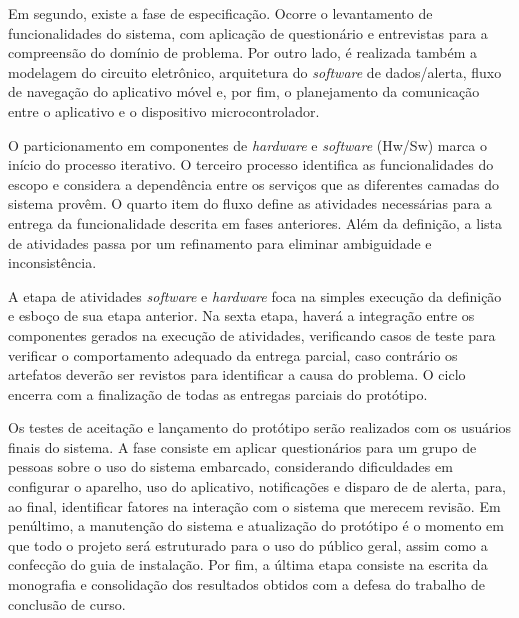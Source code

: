 Em segundo, existe a fase de especificação. Ocorre o levantamento de funcionalidades do sistema, com aplicação de questionário 
e entrevistas para a compreensão do domínio de problema. Por outro lado, é realizada também a modelagem do circuito 
eletrônico, arquitetura do \textit{software} de dados/alerta, fluxo de navegação do aplicativo móvel e, por fim, o 
planejamento da comunicação entre o aplicativo e o dispositivo microcontrolador.

O particionamento em componentes de \textit{hardware} e \textit{software} (Hw/Sw) marca o início do processo iterativo. O terceiro 
processo identifica as funcionalidades do escopo e considera a dependência entre os serviços que as diferentes camadas do sistema provêm. O quarto item 
do fluxo define as atividades necessárias para a entrega da funcionalidade descrita em fases anteriores. Além da definição, a lista de atividades passa 
por um refinamento para eliminar ambiguidade e inconsistência.

A etapa de atividades \textit{software} e \textit{hardware} foca na simples execução da definição e esboço de sua etapa anterior. Na sexta etapa, haverá a integração 
entre os componentes gerados na execução de atividades, verificando casos de teste para verificar o comportamento adequado da entrega parcial, caso contrário os artefatos 
deverão ser revistos para identificar a causa do problema. O ciclo encerra com a finalização de todas as entregas parciais do protótipo.

Os testes de aceitação e lançamento do protótipo serão realizados com os usuários finais do sistema. A fase consiste em aplicar questionários para um grupo de pessoas sobre o uso 
do sistema embarcado, considerando dificuldades em configurar o aparelho, uso do aplicativo, notificações e disparo de de alerta, para, ao final, identificar fatores na interação com o sistema que 
merecem revisão. Em penúltimo, a manutenção do sistema e atualização do protótipo é o momento em que todo o projeto será estruturado para o uso do público geral, assim como a confecção do guia 
de instalação. Por fim, a última etapa consiste na escrita da monografia e consolidação dos resultados obtidos com a defesa do trabalho de conclusão de curso.